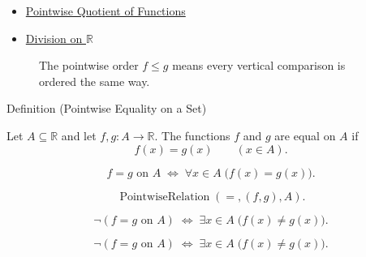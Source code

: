 \begin{dependencies}
\begin{itemize}
  \item \hyperref[def:pointwise-quotient-of-functions]{Pointwise Quotient of Functions}
  \item \hyperref[def:division-on-r]{Division on \(\mathbb{R}\)}
\end{itemize}
\end{dependencies}


\begin{figure}[htbp]
\centering

\caption{The pointwise order \(f\leq g\) means every vertical comparison is ordered the same way.}
\label{fig:pointwise-order-envelope}
\end{figure}

\begin{definitionbox}{Definition (Pointwise Equality on a Set)}
\begin{definition}
\label{def:pointwise-equality-on-set}
Let \(A\subseteq\mathbb{R}\) and let \(f,g:A\to\mathbb{R}\).  The
functions \(f\) and \(g\) are equal on \(A\) if
\[
  f(x)=g(x)
  \qquad (x\in A).
\]
\end{definition}
\end{definitionbox}

\begin{remark*}
\[
  f=g\text{ on }A
  \;\Longleftrightarrow\;
  \forall x\in A\;\bigl(f(x)=g(x)\bigr).
\]
\end{remark*}

\begin{remark*}
\[
  \operatorname{PointwiseRelation}(=,(f,g),A).
\]
\end{remark*}

\begin{remark*}
\[
  \neg(f=g\text{ on }A)
  \;\Longleftrightarrow\;
  \exists x\in A\;\bigl(f(x)\neq g(x)\bigr).
\]
\end{remark*}

\begin{remark*}
\[
  \neg(f=g\text{ on }A)
  \;\Longleftrightarrow\;
  \exists x\in A\;\bigl(f(x)\neq g(x)\bigr).
\]
\end{remark*}

